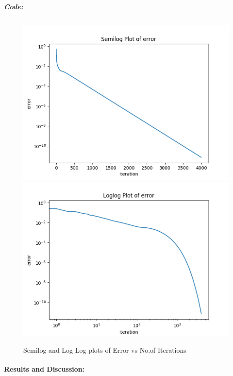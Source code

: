 \documentclass[11pt, a4paper, twoside]{article}
\begin{document}
\textit{\textbf{Code:}}
\inputminted[linenos, breaklines]{python}{Code/2.py}
     \begin{figure}[!tbh]
      \centering
      \includegraphics[scale=0.8]{Plots/Fig2.png}  
      \includegraphics[scale=0.8]{Plots/Fig3.png}  
      \caption{Semilog and Log-Log plots of Error vs No.of Iterations}
 \end{figure}
 
 \paragraph{Results and Discussion:}\label{results-and-discussion2}
\end{document}
